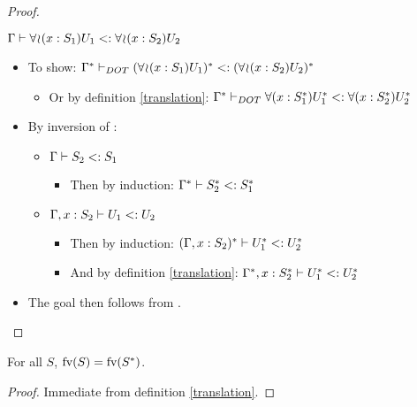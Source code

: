 \begin{proof}
\begin{itemize}
            $\Gamma \vdash \forall\!\wr\!(x:S_1)U_1 <: \forall\!\wr\!(x:S_2)U_2$
        \begin{itemize}
            \item To show: $\Gamma^{*} \vdash_{DOT} (\forall\!\wr\!(x:S_1)U_1)^{*} <: (\forall\!\wr\!(x:S_2)U_2)^{*}$
            \begin{itemize}
                \item Or by definition \ref{translation}:
                    $\Gamma^{*} \vdash_{DOT} \forall(x:S_1^{*})U_1^{*} <: \forall(x:S_2^{*})U_2^{*}$
            \end{itemize}
            \item By inversion of :
            \begin{itemize}
                \item $\Gamma \vdash S_2 <: S_1$
                \begin{itemize}
                    \item Then by induction:
                        $\Gamma^{*} \vdash S_2^{*} <: S_1^{*}$
                \end{itemize}
                \item $\Gamma, x: S_2 \vdash U_1 <: U_2$
                \begin{itemize}
                    \item Then by induction: $(\Gamma, x: S_2)^{*} \vdash U_1^{*} <: U_2^{*}$
                    \item And by definition \ref{translation}:
                        $\Gamma^{*}, x:
                        S_2^{*} \vdash U_1^{*} <: U_2^{*}$
                \end{itemize}
            \end{itemize}
            \item The goal then follows from .
        \end{itemize}
    \end{itemize}
\end{proof}

\begin{LEMMA}
    \label{pres_fv}
    For all $S$, $\text{fv}(S) = \text{fv}(S^{*})$.
\end{LEMMA}

\begin{proof}
    Immediate from definition \ref{translation}.
\end{proof}

